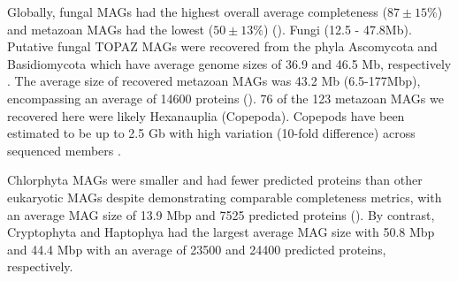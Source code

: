\documentclass[12pt]{article}
\numberwithin{equation}{section}
\begin{document}
Globally, fungal MAGs had the highest overall average completeness ($87 \pm 15\%$) and metazoan MAGs had the lowest ($50 \pm 13\%$) (). Fungi (12.5 - 47.8Mb). Putative fungal TOPAZ MAGs were recovered from the phyla Ascomycota and Basidiomycota which have average genome sizes of 36.9 and 46.5 Mb, respectively \citep{Mohanta_2015}. The average size of recovered metazoan MAGs was 43.2 Mb (6.5-177Mbp), encompassing an average of 14600 proteins (). 76 of the 123 metazoan MAGs we recovered here were likely Hexanauplia (Copepoda). Copepods have been estimated to be up to 2.5 Gb with high variation (10-fold difference) across sequenced members \citep{Jorgensen_2019}.  

Chlorphyta MAGs were smaller and had fewer predicted proteins than other eukaryotic MAGs despite demonstrating comparable completeness metrics, with an average MAG size of 13.9 Mbp and 7525 predicted proteins (). By contrast, Cryptophyta and Haptophya had the largest average MAG size with 50.8 Mbp and 44.4 Mbp with an average of 23500 and 24400 predicted proteins, respectively.
\end{document}

